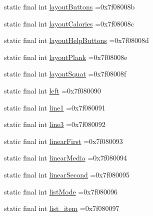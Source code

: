 \begin{DoxyCompactItemize}
static final int \mbox{\hyperlink{classcom_1_1example_1_1trainawearapplication_1_1_r_1_1id_aa4f3174e641207271206d59a91f4e521}{layout\+Buttons}} =0x7f08008b
\item 
static final int \mbox{\hyperlink{classcom_1_1example_1_1trainawearapplication_1_1_r_1_1id_a8f4391cd3e99c700cd6ed9d1e2a7e5b0}{layout\+Calories}} =0x7f08008c
\item 
static final int \mbox{\hyperlink{classcom_1_1example_1_1trainawearapplication_1_1_r_1_1id_a39f738420776cab8313ff1c27c24d52d}{layout\+Help\+Buttons}} =0x7f08008d
\item 
static final int \mbox{\hyperlink{classcom_1_1example_1_1trainawearapplication_1_1_r_1_1id_a5fed3c926754ecb0f3ed9bd179769da9}{layout\+Plank}} =0x7f08008e
\item 
static final int \mbox{\hyperlink{classcom_1_1example_1_1trainawearapplication_1_1_r_1_1id_a72b689be4ad308f15520352614a30cef}{layout\+Squat}} =0x7f08008f
\item 
static final int \mbox{\hyperlink{classcom_1_1example_1_1trainawearapplication_1_1_r_1_1id_a2cba0c6d0d6c6c478a414b99c9a9abc9}{left}} =0x7f080090
\item 
static final int \mbox{\hyperlink{classcom_1_1example_1_1trainawearapplication_1_1_r_1_1id_a8bbbb8b5e383285c844d9f0229d3a027}{line1}} =0x7f080091
\item 
static final int \mbox{\hyperlink{classcom_1_1example_1_1trainawearapplication_1_1_r_1_1id_a8d7042b2daa6b07138799e0d1740eb9d}{line3}} =0x7f080092
\item 
static final int \mbox{\hyperlink{classcom_1_1example_1_1trainawearapplication_1_1_r_1_1id_a84498cb3ddfd415666c4added32ff614}{linear\+First}} =0x7f080093
\item 
static final int \mbox{\hyperlink{classcom_1_1example_1_1trainawearapplication_1_1_r_1_1id_a479b6b4e85779cfc8b7f5c9b7e6507d3}{linear\+Media}} =0x7f080094
\item 
static final int \mbox{\hyperlink{classcom_1_1example_1_1trainawearapplication_1_1_r_1_1id_a615555b0244a14d308b26fd5d058d9f5}{linear\+Second}} =0x7f080095
\item 
static final int \mbox{\hyperlink{classcom_1_1example_1_1trainawearapplication_1_1_r_1_1id_a57b0f6f868596aafb89826f2307b7aa4}{list\+Mode}} =0x7f080096
\item 
static final int \mbox{\hyperlink{classcom_1_1example_1_1trainawearapplication_1_1_r_1_1id_a7a0e6ba877d61bfebe32c4745594fed8}{list\+\_\+item}} =0x7f080097
\item 

\end{DoxyCompactItemize}
